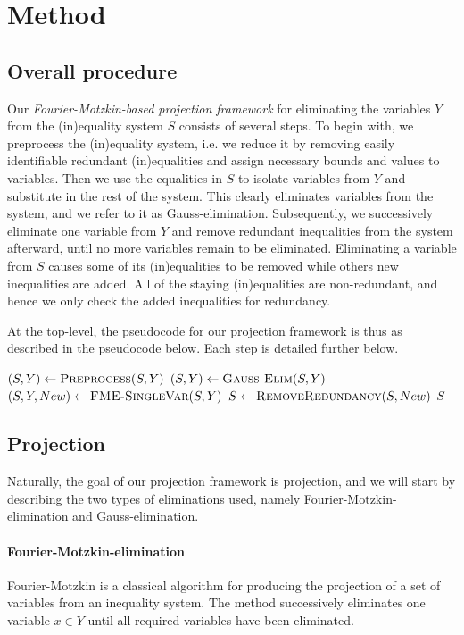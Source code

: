 %
%
\section{Method}
\subsection*{Overall procedure}
Our \emph{Fourier-Motzkin-based projection framework} for eliminating the variables $Y$ from the (in)equality system $S$ consists of several steps. 
%
To begin with, we preprocess the (in)equality system, i.e. we reduce it by removing easily identifiable redundant (in)equalities and assign necessary bounds and values to variables.
Then we use the equalities in $S$ to isolate variables from $Y$ and substitute in the rest of the system. This clearly eliminates variables from the system, and we refer to it as Gauss-elimination.  
Subsequently, we successively eliminate one variable from $Y$ and remove redundant inequalities from the system afterward, until no more variables remain to be eliminated. Eliminating a variable from $S$ causes some of its (in)equalities to be removed while others new inequalities are added. All of the {staying} (in)equalities are non-redundant, and hence we only check the added inequalities for redundancy. 

At the top-level, the pseudocode for our projection framework is thus as described in the pseudocode below. Each step is detailed further below.

\begin{center}
\begin{algorithmic}
	\State $(S,Y)\gets \Call{Preprocess}{S,Y}$
	\State $(S,Y)\gets\Call{Gauss-Elim}{S,Y}$
		\State $(S, Y, New )\gets\Call{FME-SingleVar}{S,Y}$
		\State $S\gets\Call{RemoveRedundancy}{S,New}$
	\EndWhile
	\State \Return $S$
\EndFunction
\end{algorithmic}
\end{center}

\subsection*{Projection}
Naturally, the goal of our projection framework is projection, and we will start by describing the two types of eliminations used, namely Fourier-Motzkin-elimination and Gauss-elimination. 
\paragraph{Fourier-Motzkin-elimination}
Fourier-Motzkin is a classical algorithm for producing the projection of a set of variables from an {in}equality system.
The method successively eliminates one variable $x\in Y$ until all required variables have been eliminated.  


